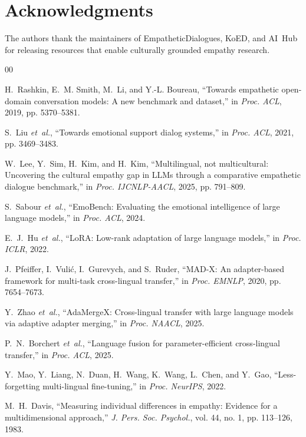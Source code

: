 \documentclass[journal]{IEEEtran}
\begin{document}
\section*{Acknowledgments}
The authors thank the maintainers of EmpatheticDialogues, KoED, and AI~Hub for releasing resources that enable culturally grounded empathy research.

\begin{thebibliography}{00}


H.~Rashkin, E.~M. Smith, M.~Li, and Y.-L. Boureau, ``Towards empathetic open-domain conversation models: A new benchmark and dataset,'' in \textit{Proc. ACL}, 2019, pp. 5370--5381.

S.~Liu \textit{et~al.}, ``Towards emotional support dialog systems,'' in \textit{Proc. ACL}, 2021, pp. 3469--3483.

W.~Lee, Y.~Sim, H.~Kim, and H.~Kim, ``Multilingual, not multicultural: Uncovering the cultural empathy gap in LLMs through a comparative empathetic dialogue benchmark,'' in \textit{Proc. IJCNLP-AACL}, 2025, pp. 791--809.

S.~Sabour \textit{et~al.}, ``EmoBench: Evaluating the emotional intelligence of large language models,'' in \textit{Proc. ACL}, 2024.

E.~J.~Hu \textit{et~al.}, ``LoRA: Low-rank adaptation of large language models,'' in \textit{Proc. ICLR}, 2022.

J.~Pfeiffer, I.~Vuli\'{c}, I.~Gurevych, and S.~Ruder, ``MAD-X: An adapter-based framework for multi-task cross-lingual transfer,'' in \textit{Proc. EMNLP}, 2020, pp. 7654--7673.

Y.~Zhao \textit{et~al.}, ``AdaMergeX: Cross-lingual transfer with large language models via adaptive adapter merging,'' in \textit{Proc. NAACL}, 2025.

P.~N.~Borchert \textit{et~al.}, ``Language fusion for parameter-efficient cross-lingual transfer,'' in \textit{Proc. ACL}, 2025.

Y.~Mao, Y.~Liang, N.~Duan, H.~Wang, K.~Wang, L.~Chen, and Y.~Gao, ``Less-forgetting multi-lingual fine-tuning,'' in \textit{Proc. NeurIPS}, 2022.

M.~H.~Davis, ``Measuring individual differences in empathy: Evidence for a multidimensional approach,'' \textit{J. Pers. Soc. Psychol.}, vol. 44, no. 1, pp. 113--126, 1983.


\end{thebibliography}
\end{document}
